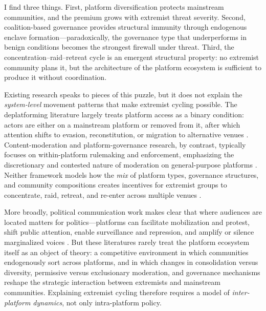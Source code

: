 \documentclass{article}
\begin{document}
I find three things. First, platform diversification protects mainstream communities, and the premium grows with extremist threat severity. Second, coalition-based governance provides structural immunity through endogenous enclave formation---paradoxically, the governance type that underperforms in benign conditions becomes the strongest firewall under threat. Third, the concentration--raid--retreat cycle is an emergent structural property: no extremist community plans it, but the architecture of the platform ecosystem is sufficient to produce it without coordination.

Existing research speaks to pieces of this puzzle, but it does not explain the \emph{system-level} movement patterns that make extremist cycling possible. The deplatforming literature largely treats platform access as a binary condition: actors are either on a mainstream platform or removed from it, after which attention shifts to evasion, reconstitution, or migration to alternative venues \citep{dehghan2022politicization}. Content-moderation and platform-governance research, by contrast, typically focuses on within-platform rulemaking and enforcement, emphasizing the discretionary and contested nature of moderation on general-purpose platforms \citep{klonick2017new}. Neither framework models how the \emph{mix} of platform types, governance structures, and community compositions creates incentives for extremist groups to concentrate, raid, retreat, and re-enter across multiple venues \citep{lavin2020culture, gais2021encrypted}.

More broadly, political communication work makes clear that where audiences are located matters for politics---platforms can facilitate mobilization and protest, shift public attention, enable surveillance and repression, and amplify or silence marginalized voices \citep{tufekci2017twitter, barberaDistractDivertHow2022, gohdesRepressionTechnologyInternet2020, panHowGovernmentcontrolledMedia2022, reny2021opinion, larson2019social, bonilla2020identity, pan2020saudi}. But these literatures rarely treat the platform ecosystem itself as an object of theory: a competitive environment in which communities endogenously sort across platforms, and in which changes in consolidation versus diversity, permissive versus exclusionary moderation, and governance mechanisms reshape the strategic interaction between extremists and mainstream communities. Explaining extremist cycling therefore requires a model of \emph{inter-platform dynamics}, not only intra-platform policy.
\end{document}
